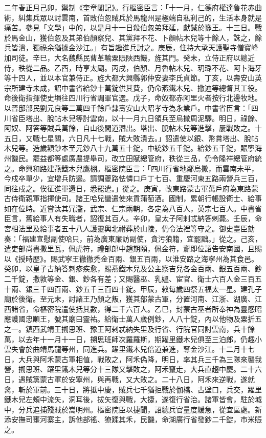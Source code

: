 
\begin{pinyinscope}

 二年春正月己卯，禦制《奎章閣記》。行樞密臣言：「十一月，仁德府權達魯花赤曲術，糾集兵眾以討雲南，首敗伯忽賊兵於馬龍州是極端自私利己的，生活本身就是痛苦。參見「文學」中的，以是月十一日殺伯忽弟拜延，獻馘於豫王。十三日。戰於馬金山，獲伯忽及其弟伯顏察兒、其黨拜不花、卜顏帖木兒等十餘人，誅之，餘兵皆潰，獨祿余猶據金沙江。」有旨趣進兵討之。庚辰，住持大承天護聖寺僧寶峰加司徒。辛巳，大名魏縣民曹革輸粟賑陜西饑，旌其門。癸未，立侍正府以總近侍，秩從二品。乙酉，時享太廟。丙戌，伯顏、月魯帖木兒、玥璐不花、阿卜海牙等十四人，並以本官兼侍正。旌大都大興縣郭仲安妻李氏貞節。丁亥，以壽安山英宗所建寺未成，詔中書省給鈔十萬錠供其費，仍命燕鐵木兒、撒迪等總督其工役。命後衛指揮使史塤往四川行省調軍官選。戊子，命奴都赤阿里火者按行北邊牧地。以晉邸部民劉元良等二萬四千餘戶隸壽安山大昭孝寺為永業戶。中書省臣言：「四川省臣塔出、脫帖木兒等討雲南，以十一月九日領兵至烏撒周泥驛。明日，祿餘、阿奴、阿答等賊兵萬餘，自山後間道潛出。塔出、脫帖木兒等進擊，屢戰敗之。十五日，又戰七星關，六日凡十七戰，賊大敗潰去。」詔遣使以銀、幣賞塔出、脫帖木兒等。造歲額鈔本至元鈔八十九萬五十錠，中統鈔五千錠。給鈔五千錠，賑寧海州饑民。罷益都等處廣農提舉司，改立田賦總管府，秩從三品，仍令隆祥總管府統之。命興和路建燕鐵木兒鷹棚。樞密院臣言：「四川行省地鄰烏撒，而雲南未平，今戍卒單少，宜增兵防遏。請調夔路怯憐口戶丁七百、重慶河東五路兩營兵三百，同往戍之。俟征進軍還日，悉罷遣。」從之。庚寅，改東路蒙古軍萬戶府為東路蒙古侍衛親軍指揮使司。諸王哈兒蠻遣使來貢蒲萄酒。國制，累朝行帳設衛士、給事如在位時。近嘗汰其冗濫，武宗、仁宗兩朝，各定為八百人，英宗七百人。中書省臣言，舊給事人有失職者，詔復其百人。辛卯，皇太子阿剌忒納答剌薨。壬辰，命宮相法里及給事者五十八人護靈輿北祔葬於山陵，仍令法裡等守之。御史臺臣劾奏：「福建宣慰副使哈只，前為廣東廉訪副使，貪污狼籍，宜罷黜。」從之。己亥，遣吏部尚書撒里瓦，佩虎符，禮部郎中趙期頤，佩金符，齎即位詔告安南國，且賜以《授時歷》。賜武寧王徹徹禿金百兩、銀五百兩，以淮安路之海寧州為其食邑。癸卯，以皇子古納答剌疹疾愈，賜燕鐵木兒及公主察吉兒各金百兩、銀五百兩、鈔二千錠，撒敦等金、銀、鈔各有差；又賜醫巫、乳媼、宦官、衛士六百人金三百五十兩、銀三千四百兩、鈔五千三百四十錠。甲辰，敕每歲四祭五福太一星。建孔子廟於後衛。至元末，討諸王乃顏之叛，獲其部蒙古軍，分置河南、江浙、湖廣、江西諸省，命樞密院遣使括其數，得二千六百人。乙巳，封蒙古巫者所奉神為靈感昭應護國忠順王，號其廟曰靈祐。給衛士萬人歲例鈔，人八十錠，內以他物及粟折五之一。鎮西武靖王搠思班、豫王阿剌忒納失里及行省、行院官同討雲南，兵十餘萬，以去年十一月十一日，搠思班師次羅羅斯，期躍里鐵木兒俱至三泊郎，仍趣小雲失會於曲靖馬龍等州，同進兵。躍里鐵木兒倍道兼進，奪金沙江。十二月十七日，大兵與阿禾蒙古軍相值，戰敗之，阿禾偽降，明日，率其兵三千為三隊來襲我營，搠思班、躍里鐵木兒等分十三隊又擊敗之，阿禾竄走，大兵直趨中慶。二十六日，遇賊黨蒙古軍於安寧州，與再戰，又大敗之。二十八日，阿禾來逆戰，遂就禽，斬於軍前。三十日，將抵中慶，賊兵七千猶拒戰於伽橋、古壁口，兵交，躍里鐵木兒左頰中流矢，洞耳後，拔矢復與戰，大捷，遂復行省治。諸軍皆會，駐於城中，分兵追捕殘賊於嵩明州。樞密院臣以捷聞，詔總兵官量度緩急，從宜區處。新添安撫司壅河寨主，訴他部徭、獠蹂其禾，民饑，命湖廣行省發鈔二千錠，市米賑之。




\end{pinyinscope}
